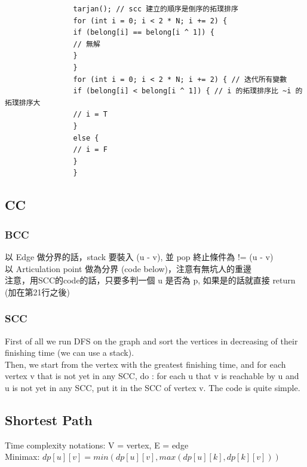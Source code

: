 \documentclass[10pt,oneside]{article}
\begin{document}
\begin{landscape}
\begin{multicols}{2}
\begin{verbatim}
				tarjan(); // scc 建立的順序是倒序的拓璞排序
				for (int i = 0; i < 2 * N; i += 2) {
				if (belong[i] == belong[i ^ 1]) {
				// 無解
				}
				}
				for (int i = 0; i < 2 * N; i += 2) { // 迭代所有變數
				if (belong[i] < belong[i ^ 1]) { // i 的拓璞排序比 ~i 的拓璞排序大
				// i = T
				}
				else {
				// i = F
				}
				}
				\end{verbatim}
				
				\subsection{CC}
				
				\subsubsection{BCC}
				{\normalsize 
					以 Edge 做分界的話，stack 要裝入 (u - v), 並 pop 終止條件為 != (u - v) \\
					以 Articulation point 做為分界 (code below)，注意有無坑人的重邊 \\
					注意，用SCC的code的話，只要多判一個 u 是否為 p, 如果是的話就直接 return (加在第21行之後)
				}
				
				\subsubsection{SCC}
				
				{\normalsize 
					First of all we run DFS on the graph and sort the vertices in decreasing of their finishing time (we can use a stack).\\
					Then, we start from the vertex with the greatest finishing time, and for each vertex v that is not yet in any SCC, do : for each u that v is reachable by u and u is not yet in any SCC, put it in the SCC of vertex v. The code is quite simple.
				}
				
				
				\subsection{Shortest Path}
				
				{\normalsize 
					Time complexity notations: V = vertex, E = edge \\
					Minimax: $dp[u][v] = min(dp[u][v], max(dp[u][k], dp[k][v]))$ \\
				}
				

\end{multicols}
\end{landscape}
\end{document}
